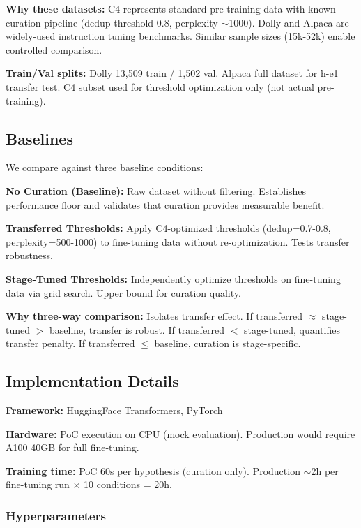 \textbf{Why these datasets:} C4 represents standard pre-training data with known curation pipeline (dedup threshold 0.8, perplexity $\sim$1000). Dolly and Alpaca are widely-used instruction tuning benchmarks. Similar sample sizes (15k-52k) enable controlled comparison.

\textbf{Train/Val splits:} Dolly 13,509 train / 1,502 val. Alpaca full dataset for h-e1 transfer test. C4 subset used for threshold optimization only (not actual pre-training).

\subsection{Baselines}

We compare against three baseline conditions:

\textbf{No Curation (Baseline):} Raw dataset without filtering. Establishes performance floor and validates that curation provides measurable benefit.

\textbf{Transferred Thresholds:} Apply C4-optimized thresholds (dedup=0.7-0.8, perplexity=500-1000) to fine-tuning data without re-optimization. Tests transfer robustness.

\textbf{Stage-Tuned Thresholds:} Independently optimize thresholds on fine-tuning data via grid search. Upper bound for curation quality.

\textbf{Why three-way comparison:} Isolates transfer effect. If transferred $\approx$ stage-tuned $>$ baseline, transfer is robust. If transferred $<$ stage-tuned, quantifies transfer penalty. If transferred $\leq$ baseline, curation is stage-specific.

\subsection{Implementation Details}

\textbf{Framework:} HuggingFace Transformers, PyTorch

\textbf{Hardware:} PoC execution on CPU (mock evaluation). Production would require A100 40GB for full fine-tuning.

\textbf{Training time:} PoC 60s per hypothesis (curation only). Production $\sim$2h per fine-tuning run $\times$ 10 conditions = 20h.

\subsubsection{Hyperparameters}

